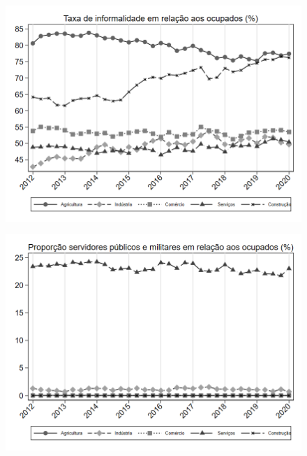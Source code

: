 \begin{frame}[label=_composicao_demografica_setor_taxa_de_informalidade]{}
\textit{\hyperlink{_composicao_demografica_setor}{}}
\begin{figure}
  \centering
  \includegraphics[width=1.0\linewidth]{../../analysis/output/composicao_demografica/setor/_composicao_demografica_setor_taxa_de_informalidade.png}
  \caption{}
  \label{fig:_composicao_demografica_setor_taxa_de_informalidade}
\end{figure}
\end{frame}


\begin{frame}[label=_composicao_demografica_setor_prop_militar]{}
\textit{\hyperlink{_composicao_demografica_setor}{}}
\begin{figure}
  \centering
  \includegraphics[width=1.0\linewidth]{../../analysis/output/composicao_demografica/setor/_composicao_demografica_setor_prop_militar.png}
  \caption{}
  \label{fig:_composicao_demografica_setor_prop_militar}
\end{figure}
\end{frame}


